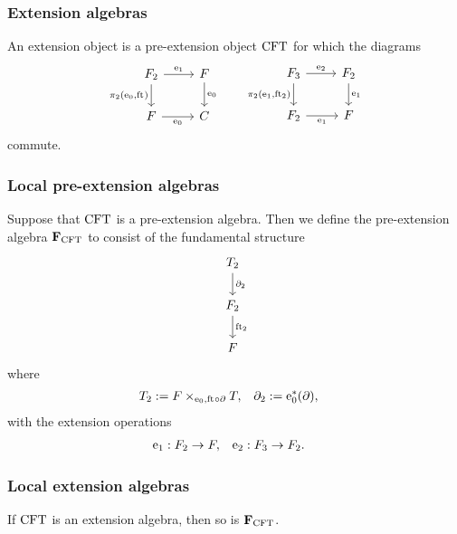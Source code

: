 \documentclass[handout]{beamer}
\begin{document}
\begin{frame}
\frametitle{Extension algebras}
An extension object is a pre-extension object $\mathrm{CFT}$ for which 
the diagrams
\begin{equation*}
\begin{tikzcd}[ampersand replacement=\&]
\stesysf_2 
  \ar{d}[swap]{\pullbackpr{2}{\ectxext}{\eft}} 
  \ar{r}{\efamext} 
  \& 
\stesysf 
  \ar{d}{\ectxext}
  \\
\stesysf 
  \ar{r}[swap]{\ectxext} 
  \& 
\stesysc
\end{tikzcd}
\qquad
\begin{tikzcd}[ampersand replacement=\&]
\stesysf_3
  \ar{d}[swap]{\pullbackpr{2}{\efamext}{\eft[2]}}
  \ar{r}{\eext{2}}
  \& 
\stesysf_2 
  \ar{d}{\efamext} 
  \\
\stesysf_2 
  \ar{r}[swap]{\efamext} 
  \&
\stesysf
\end{tikzcd}
\end{equation*}
commute.
\end{frame}

\begin{frame}
\frametitle{Local pre-extension algebras}
Suppose that $\mathrm{CFT}$ is a pre-extension algebra. Then we define
the pre-extension algebra $\mathbf{F}_{\mathrm{CFT}}$ to consist of the
fundamental structure
\begin{equation*}
\begin{tikzcd}[ampersand replacement=\&]
\stesyst_2
  \ar{d}{\ebd[2]}
  \\
\stesysf_2
  \ar{d}{\eft[2]}
  \\
\stesysf
\end{tikzcd}
\end{equation*}
where
\begin{align*}
\stesyst_2 
  & := \pullback{\stesysf}{\stesyst}{\ectxext}{\eft\circ\ebd},
  &
\ebd[2]
  & := \ectxext^\ast(\ebd),
\end{align*}
with the extension operations
\begin{align*}
\mathrm{e}_{1} 
  & 
: F_2\to F,
  &
\mathrm{e}_{2} 
  & 
: F_3\to F_2.
\end{align*}
\end{frame}

\begin{frame}
\frametitle{Local extension algebras}
\begin{theorem}
If $\mathrm{CFT}$ is an extension algebra, then so is $\mathbf{F}_{\mathrm{CFT}}$.
\end{theorem}
\end{frame}
\end{document}
